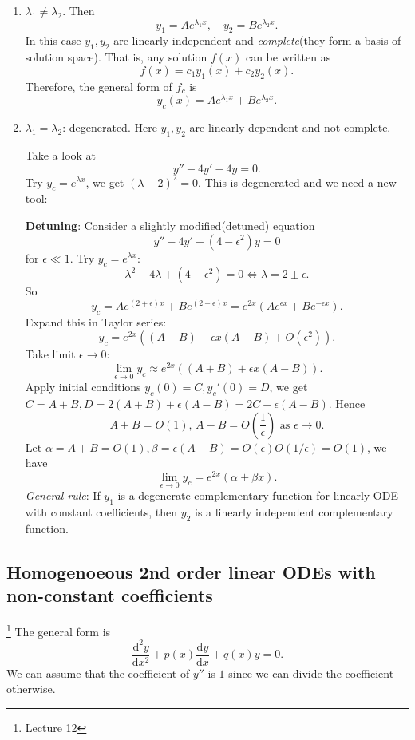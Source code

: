 \documentclass[a4paper]{article}
\begin{document}
    \begin{enumerate}
        \item $ \lambda_1\neq \lambda_2$. Then
        \[
            y_1=Ae^{\lambda_1 x},\quad y_2=Be^{\lambda_2 x}
        .\]
        In this case $ y_1,y_2 $ are linearly independent and \textit{complete}(they form a basis of solution space). That is, any solution $f(x)$ can be written as 
        \[
            f(x)=c_1y_1(x)+c_2y_2(x)
        .\]
        Therefore, the general form of $f_c$ is 
        \[
            y_c(x)=Ae^{\lambda_1 x}+Be^{\lambda_2 x}
        .\]
        \item $ \lambda_1=\lambda_2 $: degenerated. Here $ y_1,y_2 $ are linearly dependent and not complete.
        \begin{example}
            Take a look at
            \[
                y''-4y'-4y=0
            .\]
            Try $ y_c=e^{\lambda x} $, we get $ (\lambda-2)^2=0 $. This is degenerated and we need a new tool:
        \end{example}
        \textbf{Detuning}: Consider a slightly modified(detuned) equation 
        \[
           y''-4y'+(4-\epsilon^2)y=0 
        \]
        for $ \epsilon\ll 1 $. Try $ y_c=e^{\lambda x} $:
        \[
            \lambda^2-4\lambda+(4-\epsilon^2)=0 \Longleftrightarrow \lambda=2\pm \epsilon
        .\]
        So
        \[
            y_c=Ae^{(2+\epsilon)x}+Be^{(2-\epsilon)x}=e^{2x}(Ae^{\epsilon x}+Be^{-\epsilon x})
        .\]
        Expand this in Taylor series:
        \[
            y_c=e^{2x}\left( (A+B)+\epsilon x(A-B)+O(\epsilon^2) \right)
        .\]
        Take limit $ \epsilon\to 0 $:
        \[
            \lim_{\epsilon \to 0} y_c \approx e^{2x}\left( (A+B)+\epsilon x(A-B) \right)
        .\]
        Apply initial conditions $ y_c(0)=C, y_c'(0)=D $, we get $ C=A+B, D=2(A+B)+\epsilon(A-B)=2C+\epsilon(A-B) $. Hence 
        \[
            A+B=O(1),\, A-B=O\left(\frac{1}{\epsilon}\right) \text{ as }\epsilon\to 0
        .\]
        Let $ \alpha=A+B=O(1), \beta=\epsilon(A-B)=O(\epsilon)O(1/\epsilon)=O(1) $, we have 
        \[
            \lim_{\epsilon \to 0} y_c=e^{2x}(\alpha+\beta x)
        .\]
        \textit{General rule}: If $y_1$ is a degenerate complementary function for linearly ODE with constant coefficients, then $ y_2 $ is a linearly independent complementary function.
    \end{enumerate}
    \subsection{Homogenoeous 2nd order linear ODEs with non-constant coefficients}
    \footnote{Lecture 12}
    The general form is 
    \begin{equation}\label{eq:2nd non-const}
        \frac{\mathrm{d}^2y}{\mathrm{d}x^2}+p(x)\frac{\mathrm{d}y}{\mathrm{d}x} +q(x)y=0.
    \end{equation}
    We can assume that the coefficient of $y''$ is $1$ since we can divide the coefficient otherwise.
\end{document}
